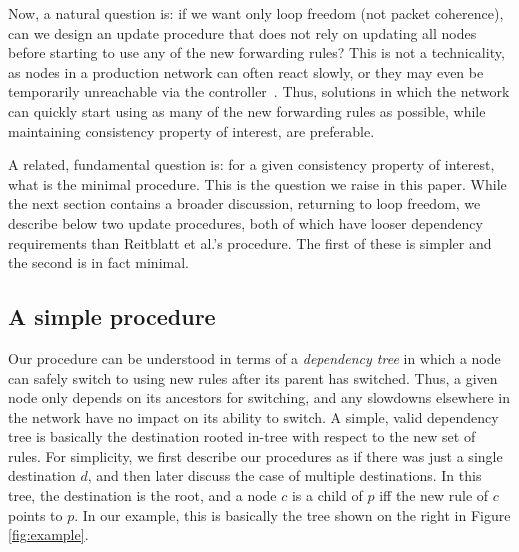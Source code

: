 Now, a natural question is: if we want only loop freedom (not packet coherence), can we design an update procedure that does not rely on updating all nodes before starting to use any of the new forwarding rules?  This is not a technicality, as nodes in a production network can often react slowly, or they may even be temporarily unreachable via the controller~\cite{b4}.  Thus, solutions in which the network can quickly start using as many of the new forwarding rules as possible, while maintaining consistency property of interest, are preferable.

A related, fundamental question is: for a given consistency property of interest, what is the minimal procedure. This is the question we raise in this paper. While the next section contains a broader discussion, returning to loop freedom, we describe below two update procedures, both of which have looser dependency requirements than Reitblatt et al.'s procedure.  The first of these is simpler and the second is in fact minimal.



\subsection{A simple procedure}
\label{sec:practical}


Our procedure can be understood in terms of a {\em dependency tree} in which a node can safely switch to using new rules after its parent has switched. Thus, a given node only depends on its ancestors for switching, and any slowdowns elsewhere in the network have no impact on its ability to switch. A simple, valid dependency tree is basically the destination rooted in-tree with respect to the new set of rules. For simplicity, we first describe our procedures as if there was just a single destination $d$, and then later discuss the case of multiple destinations. In this tree, the destination is the root, and a node $c$ is a child of $p$ iff the new rule of $c$ points to $p$. In our example, this is basically the tree shown on the right in Figure \ref{fig:example}.

